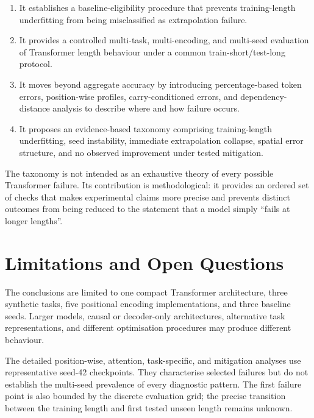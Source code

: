 \documentclass[
    author={Aanchala Ravindra Bhongade},
    supervisor={Dr. Fernando Moreno-Pino},
    degree={MSc},
    title={Length Generalisation in Transformer-Based Sequence Models: Failure Taxonomy and Mitigation Strategies},
    subtitle={},
    type={},
    year={2026}
]{dissertation}
\begin{document}
\begin{enumerate}
    \item It establishes a baseline-eligibility procedure that prevents training-length underfitting from being misclassified as extrapolation failure.

    \item It provides a controlled multi-task, multi-encoding, and multi-seed evaluation of Transformer length behaviour under a common train-short/test-long protocol.

    \item It moves beyond aggregate accuracy by introducing percentage-based token errors, position-wise profiles, carry-conditioned errors, and dependency-distance analysis to describe where and how failure occurs.

    \item It proposes an evidence-based taxonomy comprising training-length underfitting, seed instability, immediate extrapolation collapse, spatial error structure, and no observed improvement under tested mitigation.
\end{enumerate}

The taxonomy is not intended as an exhaustive theory of every possible Transformer failure. Its contribution is methodological: it provides an ordered set of checks that makes experimental claims more precise and prevents distinct outcomes from being reduced to the statement that a model simply ``fails at longer lengths''.

\section{Limitations and Open Questions}

The conclusions are limited to one compact Transformer architecture, three synthetic tasks, five positional encoding implementations, and three baseline seeds. Larger models, causal or decoder-only architectures, alternative task representations, and different optimisation procedures may produce different behaviour.

The detailed position-wise, attention, task-specific, and mitigation analyses use representative seed-42 checkpoints. They characterise selected failures but do not establish the multi-seed prevalence of every diagnostic pattern.
The first failure point is also bounded by the discrete evaluation grid; the precise transition between the training length and first tested unseen length remains unknown.
\end{document}
